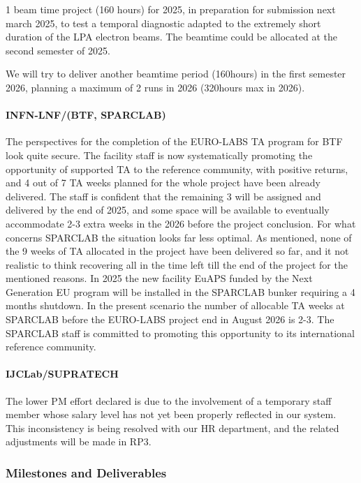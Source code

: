 {1 beam time project (160 hours) for 2025, in preparation for submission next march 2025, to test a temporal diagnostic adapted to the extremely short duration of the LPA electron beams. The beamtime could be allocated at the second semester of 2025.

We will try to deliver another beamtime period (160hours) in the first semester 2026, planning a maximum of 2 runs in 2026 (320hours max in 2026).

\paragraph{INFN-LNF/(BTF, SPARCLAB)}

The perspectives for the completion of the EURO-LABS TA program for BTF look quite secure. The facility staff is now systematically promoting the opportunity of supported TA to the reference community, with positive returns, and 4 out of 7 TA weeks planned for the whole project have been already delivered. The staff is confident that the remaining 3 will be assigned and delivered by the end of 2025, and some space will be available to eventually accommodate 2-3 extra weeks in the 2026 before the project conclusion.
For what concerns SPARCLAB the situation looks far less optimal. As mentioned, none of the 9 weeks of TA allocated in the project have been delivered so far, and it not realistic to think recovering all in the time left till the end of the project for the mentioned reasons. In 2025 the new facility EuAPS funded by the Next Generation EU program will be installed in the SPARCLAB bunker requiring a 4 months shutdown. In the present scenario the number of allocable TA weeks at SPARCLAB before the EURO-LABS project end in August 2026 is 2-3. The SPARCLAB staff is committed to promoting this opportunity to its international reference community.

\paragraph{IJCLab/SUPRATECH}

The lower PM effort declared is due to the involvement of a temporary staff member whose salary level has not yet been properly reflected in our system. This inconsistency is being resolved with our HR department, and the related adjustments will be made in RP3.

\subsubsection*{Milestones and Deliverables}

}
